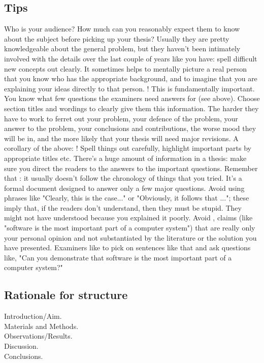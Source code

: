\subsection*{Tips}
 Who is your audience? How much can you
reasonably expect them to know about the subject before picking up your thesis? 
Usually they are pretty knowledgeable about the general problem, 
but they haven't been intimately involved with the details over the last couple of years like 
you have: spell difficult new concepts out clearly. 
It sometimes helps to mentally picture a real person that you know who has the appropriate 
background, and to imagine that you are explaining your ideas directly to that person.
\nextparagraph{}
! This is fundamentally important. You know what few
questions the examiners need answers for (see above). 
Choose section titles and wordings to clearly give them this information. 
The harder they have to work to ferret out your problem, your defence of the problem, 
your answer to the problem, your conclusions and contributions, the worse mood they will be in, 
and the more likely that your thesis will need major revisions.
\nextparagraph{}
A corollary of the above: ! Spell things out carefully,
highlight important parts by appropriate titles etc. 
There's a huge amount of information in a thesis: make sure you direct the readers to the 
answers to the important questions.
\nextparagraph{}
Remember that : it usually doesn't follow the chronology of things
that you tried. It's a formal document designed to answer only a few major questions.
\nextparagraph{}
Avoid using phrases like "Clearly, this is the case..." or "Obviously, it follows that ..."; 
these imply that, if the readers don't understand, then they must be stupid. 
They might not have understood because you explained it poorly.
\nextparagraph{}
Avoid , claims (like "software is the most important part of a computer system")
that are really only your personal opinion and not substantiated by the literature or the 
solution you have presented. Examiners like to pick on sentences like that and ask questions like, 
"Can you demonstrate that software is the most important part of a computer system?"

\subsection*{Rationale for structure}
Introduction/Aim. \\
Materials and Methods. \\
Observations/Results. \\
Discussion. \\
Conclusions. 

